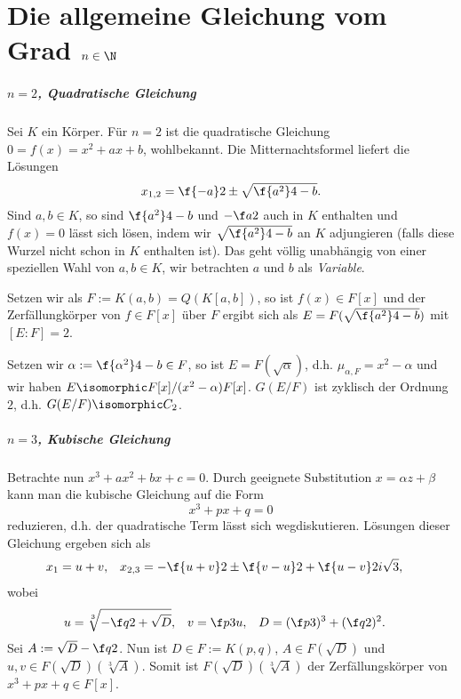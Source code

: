 \chapter{Die allgemeine Gleichung vom Grad \texorpdfstring{$n \in \N$}{nϵℕ}}

\paragraph{$n = 2$, Quadratische Gleichung}

Sei $K$ ein Körper.
Für $n = 2$ ist die quadratische Gleichung $0 = f(x) = x^2 + ax + b$, wohlbekannt.
Die Mitternachtsformel liefert die Lösungen
\[
	x_{1,2} = \f{-a}2 \pm \sqrt{\f{a^2}4 - b}.
\]
Sind $a, b \in K$, so sind $\f{a^2}4 - b$ und $-\f a2$ auch in $K$ enthalten und $f(x) = 0$ lässt sich lösen, indem wir $\sqrt{\f {a^2}4 - b}$ an $K$ adjungieren (falls diese Wurzel nicht schon in $K$ enthalten ist).
Das geht völlig unabhängig von einer speziellen Wahl von $a, b \in K$, wir betrachten $a$ und $b$ als \emph{Variable}.

Setzen wir als $F := K(a,b) = Q(K[a,b])$, so ist $f(x) \in F[x]$ und der Zerfällungkörper von $f \in F[x]$ über $F$ ergibt sich als $E = F(\sqrt{\f{a^2}4 - b})$ mit $[E : F] = 2$.

Setzen wir $\alpha := \f {\alpha^2}4 - b \in F$, so ist $E = F(\sqrt {\alpha})$, d.h. $\mu_{\alpha, F} = x^2 - \alpha$ und wir haben $E \isomorphic F[x] / (x^2 - \alpha) F[x]$.
$G(E / F)$ ist zyklisch der Ordnung $2$, d.h. $G(E / F) \isomorphic C_2$.

\paragraph{$n = 3$, Kubische Gleichung}
Betrachte nun $x^3 + ax^2 + bx + c = 0$.
Durch geeignete Substitution $x = \alpha z + \beta$ kann man die kubische Gleichung auf die Form
\[
	x^3 + px + q = 0
\]
reduzieren, d.h. der quadratische Term lässt sich wegdiskutieren.
Lösungen dieser Gleichung ergeben sich als
\begin{align*}
	x_1 &= u + v, &
	x_{2,3} &= -\f{u+v}2 \pm \f{v-u}2 + \f{u-v}2 i \sqrt 3,
\end{align*}
wobei
\begin{align*}
	u &= \sqrt[3]{-\f q2 + \sqrt D}, &
	v &= \f p{3u}, &
	D &= (\f p3)^3 + (\f q2)^2.
\end{align*}
Sei $A := \sqrt{D} - \f q2$.
Nun ist $D \in F := K(p,q)$, $A \in F(\sqrt D)$ und $u,v \in F(\sqrt D)(\sqrt[3]{A})$.
Somit ist $F(\sqrt D)(\sqrt[3]{A})$ der Zerfällungskörper von $x^3 + px + q \in F[x]$.

